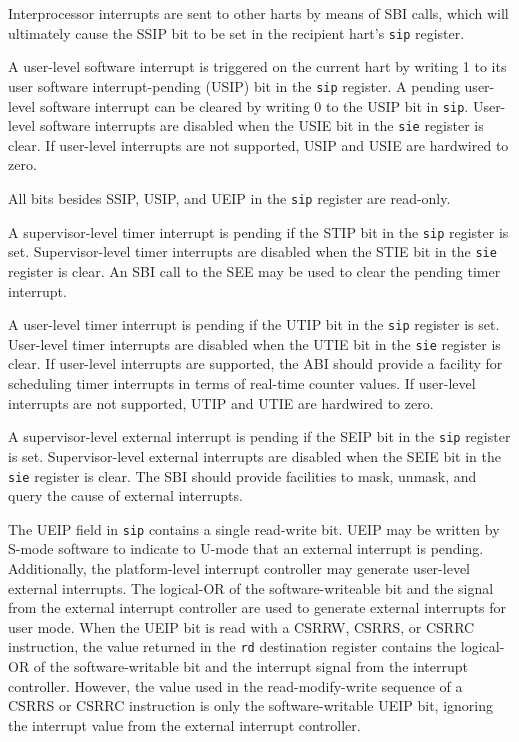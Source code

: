 Interprocessor interrupts are sent to other harts by means of SBI
calls, which will ultimately cause the SSIP bit to be set in the
recipient hart's {\tt sip} register.

A user-level software interrupt is triggered on the current hart by writing
1 to its user software interrupt-pending (USIP) bit in the {\tt sip} register.
A pending user-level software interrupt can be cleared by writing 0 to the
USIP bit in {\tt sip}.  User-level software interrupts are disabled when the
USIE bit in the {\tt sie} register is clear.  If user-level interrupts are not
supported, USIP and USIE are hardwired to zero.

All bits besides SSIP, USIP, and UEIP in the {\tt sip} register are read-only.

A supervisor-level timer interrupt is pending if the STIP bit in the {\tt sip}
register is set.  Supervisor-level timer interrupts are disabled when the STIE
bit in the {\tt sie} register is clear.  An SBI call to the SEE may be used to
clear the pending timer interrupt.

A user-level timer interrupt is pending if the UTIP bit in the {\tt sip}
register is set.  User-level timer interrupts are disabled when the UTIE bit
in the {\tt sie} register is clear.  If user-level interrupts are supported,
the ABI should provide a facility for scheduling timer interrupts in terms of
real-time counter values.  If user-level interrupts are not supported, UTIP
and UTIE are hardwired to zero.

A supervisor-level external interrupt is pending if the SEIP bit in the
{\tt sip} register is set.  Supervisor-level external interrupts are disabled
when the SEIE bit in the {\tt sie} register is clear.  The SBI should provide
facilities to mask, unmask, and query the cause of external interrupts.

The UEIP field in {\tt sip} contains a single read-write bit.  UEIP
may be written by S-mode software to indicate to U-mode that an
external interrupt is pending.  Additionally, the platform-level
interrupt controller may generate user-level external interrupts.  The
logical-OR of the software-writeable bit and the signal from the
external interrupt controller are used to generate external interrupts
for user mode.  When the UEIP bit is read with a CSRRW, CSRRS, or
CSRRC instruction, the value returned in the {\tt rd} destination
register contains the logical-OR of the software-writable bit and the
interrupt signal from the interrupt controller.  However, the value
used in the read-modify-write sequence of a CSRRS or CSRRC instruction
is only the software-writable UEIP bit, ignoring the interrupt value
from the external interrupt controller.

